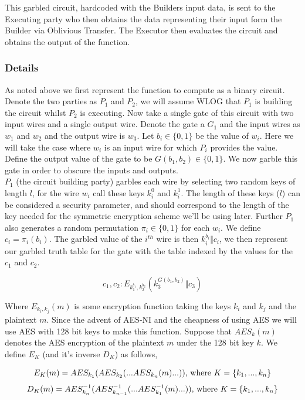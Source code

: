 \documentclass[a4paper,10pt]{article}
\begin{document}
				This garbled circuit, hardcoded with the Builders input data, is sent to the Executing party who then obtains the data representing their input form the Builder via Oblivious Transfer. The Executor then evaluates the circuit and obtains the output of the function.


			\subsubsection{Details} \label{Yao_Details}
				As noted above we first represent the function to compute as a binary circuit. Denote the two parties as $P_1$ and $P_2$, we will assume WLOG that $P_1$ is building the circuit whilst $P_2$ is executing. Now take a single gate of this circuit with two input wires and a single output wire. Denote the gate a $G_1$ and the input wires as $w_1$ and $w_2$ and the output wire is $w_3$. Let $b_i \in \{0, 1\}$ be the value of $w_i$. Here we will take the case where $w_i$ is an input wire for which $P_i$ provides the value. Define the output value of the gate to be $G(b_1, b_2) \in \{0, 1\}$. We now garble this gate in order to obscure the inputs and outputs.\\

				$P_1$ (the circuit building party) garbles each wire by selecting two random keys of length $l$, for the wire $w_i$ call these keys $k_i^0$ and $k_i^1$. The length of these keys ($l$) can be considered a security parameter, and should correspond to the length of the key needed for the symmetric encryption scheme we'll be using later. Further $P_1$ also generates a random permutation $\pi_i \in \{0, 1\}$ for each $w_i$. We define $c_i = \pi_i(b_i)$. The garbled value of the $i^{th}$ wire is then $k_i^{b_i} \Vert c_i$, we then represent our garbled truth table for the gate with the table indexed by the values for the $c_1$ and $c_2$.

				$$ c_1, c_2 : E_{k_1^{b_1}, k_2^{b_2}} (k_3^{ G(b_1, b_2) } \Vert c_3) $$

				Where $E_{k_i, k_j}(m)$ is some encryption function taking the keys $k_i$ and $k_j$ and the plaintext $m$. Since the advent of AES-NI and the cheapness of using AES we will use AES with 128 bit keys to make this function. Suppose that $AES_k(m)$ denotes the AES encryption of the plaintext $m$ under the 128 bit key $k$. We define $E_K$ (and it's inverse $D_K$) as follows,

				$$ E_K(m) = AES_{k_1}( AES_{k_2}( ...AES_{k_n}(m) ...) ) \textnormal{, where } K = \{k_1, ..., k_n\}$$ 
				$$ D_K(m) = AES^{-1}_{k_n}( AES^{-1}_{k_{n-1}}( ...AES^{-1}_{k_1}(m) ...) ) \textnormal{, where } K = \{k_1, ..., k_n\}$$ 
\end{document}

